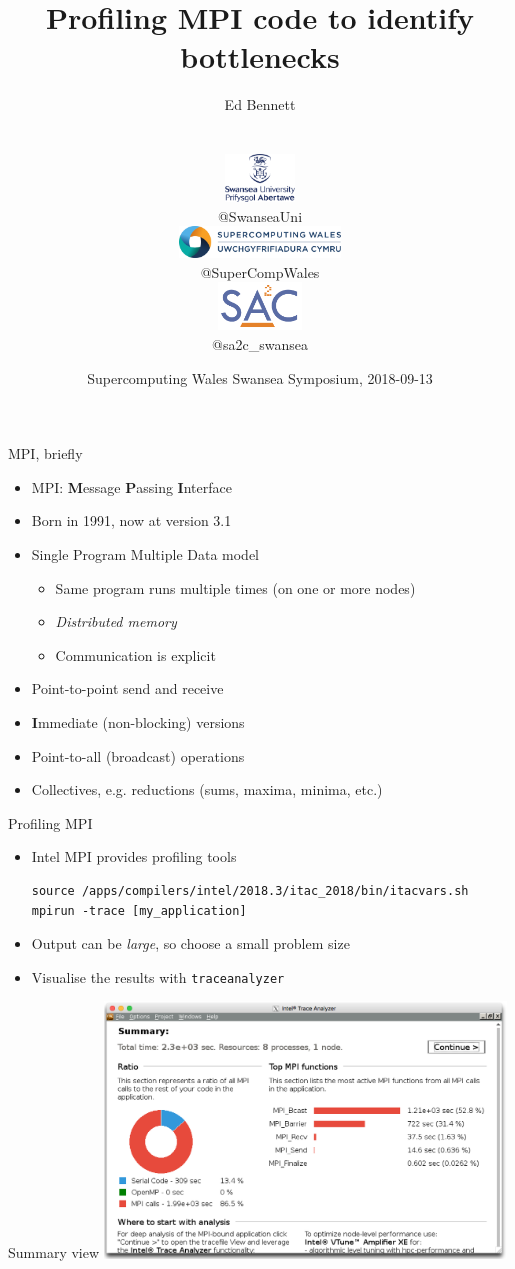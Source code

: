 \documentclass[handout]{beamer}
\title{Profiling MPI code to identify bottlenecks}
\author{{\large Ed Bennett}
	\\{\small@QuantumofEd}
	\\\vspace{16pt}
	\hfill
	\parbox{0.22\textwidth}{\centering\includegraphics[height=36pt]{logos/swansea}\\\small @SwanseaUni}
	\parbox{0.44\textwidth}{\centering\includegraphics[height=24pt]{logos/scw}\\\small @SuperCompWales}
	\parbox{0.22\textwidth}{\centering\includegraphics[height=36pt]{logos/sa2c}\\\small @sa2c\_swansea} }
\date{Supercomputing Wales Swansea Symposium, 2018-09-13}
\begin{document}
\frame{\titlepage}

\begin{frame}[fragile]{MPI, briefly}
	\begin{itemize}[<+->]
		\item MPI: \textbf{M}essage \textbf{P}assing \textbf{I}nterface
		\item Born in 1991, now at version 3.1
		\item Single Program Multiple Data model
		\begin{itemize}[<+->]
			\item Same program runs multiple times (on one or more nodes)
			\item \emph{Distributed memory}
			\item Communication is explicit
		\end{itemize}
		\item Point-to-point send and receive
		\item \textbf{I}mmediate (non-blocking) versions
		\item Point-to-all (broadcast) operations
		\item Collectives, e.g. reductions (sums, maxima, minima, etc.)
	\end{itemize}
\end{frame}

\begin{frame}[fragile]{Profiling MPI}
	\begin{itemize}[<+->]
		\item Intel MPI provides profiling tools
		\begin{verbatim}source /apps/compilers/intel/2018.3/itac_2018/bin/itacvars.sh
mpirun -trace [my_application]\end{verbatim}
		\item Output can be \emph{large}, so choose a small problem size
		\item Visualise the results with \verb|traceanalyzer|
	\end{itemize}
\end{frame}

\begin{frame}{Summary view}
	\centering
	\includegraphics[width=0.8\textwidth]{figs/first-overview}
\end{frame}
\end{document}
